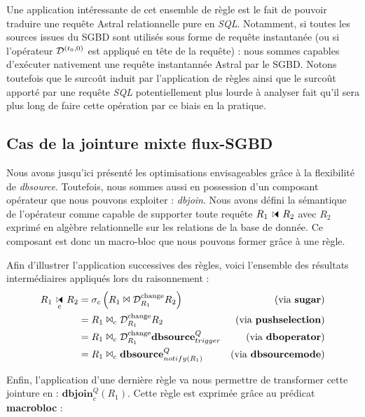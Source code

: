 Une application intéressante de cet ensemble de règle est le fait de pouvoir traduire une requête Astral relationnelle pure en \textit{SQL}. Notamment, si toutes les sources issues du SGBD sont utilisés sous forme de requête instantanée (ou si l'opérateur $\mathcal{D}^{(t_0,0)}$ est appliqué en tête de la requête) : nous sommes capables d'exécuter nativement une requête instantannée Astral par le SGBD. Notons toutefois que le surcoût induit par l'application de règles ainsi que le surcoût apporté par une requête \textit{SQL} potentiellement plus lourde à analyser fait qu'il sera plus long de faire cette opération par ce biais en la pratique.

\subsection{Cas de la jointure mixte flux-SGBD}\label{sec:contrib:asteroid:reecriture:join}
Nous avons jusqu'ici présenté les optimisations envisageables grâce à la flexibilité de \textit{dbsource}. Toutefois, nous sommes aussi en possession d'un composant opérateur que nous pouvons exploiter : \textit{dbjoin}. Nous avons défini la sémantique de l'opérateur comme capable de supporter toute requête $R_1\ssjoin R_2$ avec $R_2$ exprimé en algèbre relationnelle sur les relations de la base de donnée. Ce composant est donc un macro-bloc que nous pouvons former grâce à une règle.

Afin d'illustrer l'application successives des règles, voici l'ensemble des résultats intermédiaires appliqués lors du raisonnement :
\begin{align*} 
R_1\ssjoin_c R_2 &= \sigma_c \left(R_1 \Join \D^{\mathrm{change}}_{R_1} R_2\right) & \text{(via \textbf{sugar})}\\
& =  R_1 \Join_c \D^{\mathrm{change}}_{R_1} R_2 & \text{(via \textbf{pushselection})}\\
& =  R_1 \Join_c \D^{\mathrm{change}}_{R_1} \textbf{dbsource}_{trigger}^{Q} & \text{(via \textbf{dboperator})}\\
& =  R_1 \Join_c \textbf{dbsource}_{notify(R_1)}^{Q} & \text{(via \textbf{dbsourcemode})}
\end{align*}

Enfin, l'application d'une dernière règle va nous permettre de transformer cette jointure en : $\textbf{dbjoin}^Q_c (R_1)$. Cette règle est exprimée grâce au prédicat \textbf{macrobloc} :

